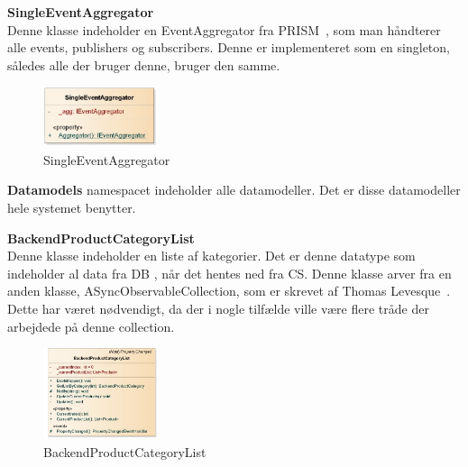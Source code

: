  
\textbf{SingleEventAggregator}\\
Denne klasse indeholder en EventAggregator fra PRISM~\cite{PRISM}, som man håndterer alle events, publishers og subscribers. Denne er implementeret som en singleton, således alle der bruger denne, bruger den samme.
\begin{center}
\begin{figure}[!h]
    \centering
    \includegraphics[width=0.30\textwidth]{Systemdesign/backend/klassebeskrivelser/Images/agg.png}
    \caption{SingleEventAggregator}
    \label{fig:SingleEventAggregator}
\end{figure}
\end{center}
\label{SingleEventAggregator_Beskrivelse}
 \bigskip 

\bigskip
\bigskip

\textbf{Datamodels} namespacet indeholder alle datamodeller. Det er disse datamodeller hele systemet benytter.\\
\bigskip

\textbf{BackendProductCategoryList}\\
Denne klasse indeholder en liste af kategorier. Det er denne datatype som indeholder al data fra \gls{DB} , når det hentes ned fra \gls{CS}. Denne klasse arver fra en anden klasse, ASyncObservableCollection, som er skrevet af Thomas Levesque~\cite{ASYNC}. Dette har været nødvendigt, da der i nogle tilfælde ville være flere tråde der arbejdede på denne collection.
\begin{center}
\begin{figure}[!h]
    \centering
    \includegraphics[width=0.30\textwidth]{Systemdesign/backend/klassebeskrivelser/Images/BPCList.png}
    \caption{BackendProductCategoryList}
    \label{fig:BackendProductCategoryList}
\end{figure}
\end{center}
\label{BackendProductCategoryList_Beskrivelse}
 \bigskip 
 
